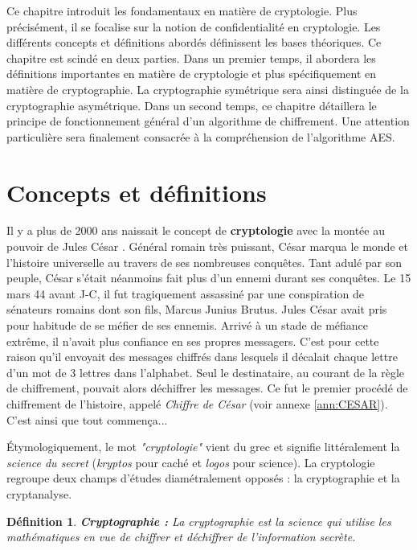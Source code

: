 \documentclass[oneside]{book}
\newtheorem{definition}{Définition}[section]
\begin{document}
Ce chapitre introduit les fondamentaux en matière de cryptologie. Plus précisément, il se focalise sur la notion de confidentialité en cryptologie. Les différents concepts et définitions abordés définissent les bases théoriques. Ce chapitre est scindé en deux parties. Dans un premier temps, il abordera les définitions importantes en matière de cryptologie et plus spécifiquement en matière de cryptographie. La cryptographie symétrique sera ainsi distinguée de la cryptographie asymétrique. Dans un second temps, ce chapitre détaillera le principe de fonctionnement général d'un algorithme de chiffrement. Une attention particulière sera finalement consacrée à la compréhension de l'algorithme AES.

\section{Concepts et définitions}
\label{sec:Concepts}

Il y a plus de 2000 ans naissait le concept de \textbf{cryptologie} avec la montée au pouvoir de Jules César \cite{intro_crypto}. Général romain très puissant, César marqua le monde et l'histoire universelle au travers de ses nombreuses conquêtes. Tant adulé par son peuple, César s'était néanmoins fait plus d'un ennemi durant ses conquêtes. Le 15 mars 44 avant J-C, il fut tragiquement assassiné par une conspiration de sénateurs romains dont son fils, Marcus Junius Brutus. Jules César avait pris pour habitude de se méfier de ses ennemis. Arrivé à un stade de méfiance extrême, il n'avait plus confiance en ses propres messagers. C'est pour cette raison qu'il envoyait des messages chiffrés dans lesquels il décalait chaque lettre d'un mot de 3 lettres dans l'alphabet. Seul le destinataire, au courant de la règle de chiffrement, pouvait alors déchiffrer les messages. Ce fut le premier procédé de chiffrement de l'histoire, appelé \textit{Chiffre de César} (voir annexe \ref{ann:CESAR}). \\
C'est ainsi que tout commença...

Étymologiquement, le mot \textit{"cryptologie"} \cite{intro_crypto} vient du grec et signifie littéralement la \textit{science du secret} (\textit{kryptos}  pour caché et \textit{logos} pour science). La cryptologie regroupe deux champs d'études diamétralement opposés : la cryptographie et la cryptanalyse.

\theoremstyle{definition}
\begin{definition}{\textbf{Cryptographie : }}
La cryptographie est la science qui utilise les mathématiques en vue de chiffrer et déchiffrer de l'information secrète.
\end{definition}
\end{document}

